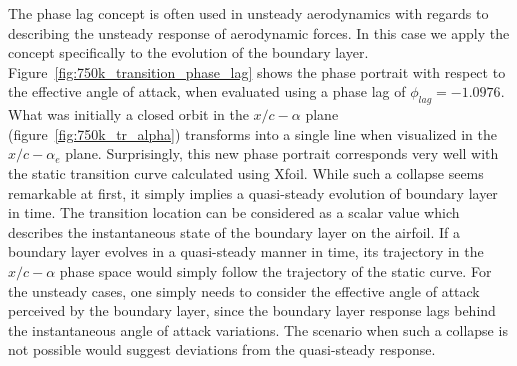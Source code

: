 The phase lag concept is often used in unsteady aerodynamics \citep{theodorsen35,leishman00,bisplingoff00,mccroskey82} with regards to describing the unsteady response of aerodynamic forces. In this case we apply the concept specifically to the evolution of the boundary layer. Figure~\ref{fig:750k_transition_phase_lag} shows the phase portrait with respect to the effective angle of attack, when evaluated using a phase lag of $\phi_{lag}=-1.0976$.
What was initially a closed orbit in the $x/c-\alpha$ plane (figure~\ref{fig:750k_tr_alpha}) transforms into a single line when visualized in the $x/c-\alpha_{e}$ plane. Surprisingly, this new phase portrait corresponds very well with the static transition curve calculated using Xfoil. 
While such a collapse seems remarkable at first, it simply implies a quasi-steady evolution of boundary layer in time. The transition location can be considered as a scalar value which describes the instantaneous state of the boundary layer on the airfoil. If a boundary layer evolves in a quasi-steady manner in time, its trajectory in the $x/c-\alpha$ phase space would simply follow the trajectory of the static curve. For the unsteady cases, one simply needs to consider the effective angle of attack perceived by the boundary layer, since the boundary layer response lags behind the instantaneous angle of attack variations. The scenario when such a collapse is not possible would suggest deviations from the quasi-steady response.
